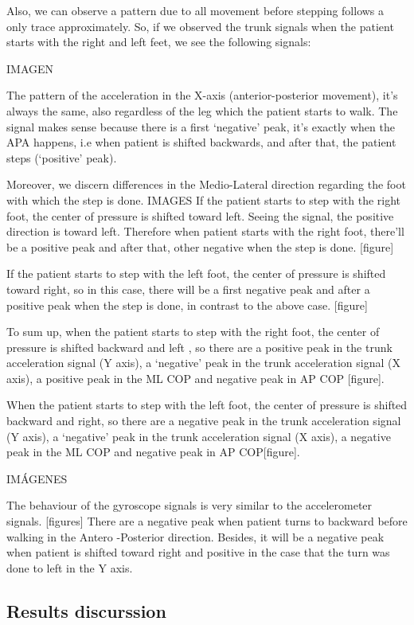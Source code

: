 Also, we can observe a pattern due to all movement before stepping follows a only trace approximately. So, if we observed the trunk signals when the patient starts with the right and left feet, we see the following signals:

IMAGEN

The pattern of the acceleration in the X-axis (anterior-posterior movement), it’s always the same, also regardless of the leg which the patient starts to walk. The signal makes sense because there is a first ‘negative’ peak, it’s exactly when the APA happens, i.e when patient is shifted backwards, and after that, the patient steps (‘positive’ peak).

Moreover, we discern differences in the Medio-Lateral direction regarding the foot with which the step is done. 
IMAGES
If the patient starts to step with the right foot, the center of pressure is shifted toward left. Seeing the signal, the positive direction is toward left. Therefore when patient starts with the right foot, there’ll be a positive peak and after that, other negative when the step is done. [figure]

If the patient starts to step with the left foot, the center of pressure is shifted toward right, so in this case, there will be a first negative peak and after a positive peak when the step is done, in contrast to the above case. [figure]

To sum up, when the patient starts to step with the right foot, the center of pressure  is shifted backward and left ,  so there are a positive peak in the trunk acceleration signal (Y axis), a ‘negative’ peak in the trunk acceleration signal (X axis), a positive peak in the ML COP and negative peak in AP COP [figure]. 

When the patient starts to step with the left foot, the center of pressure is shifted backward and right, so there are a negative peak in the trunk acceleration signal (Y axis), a ‘negative’ peak in the trunk acceleration signal (X axis), a negative peak in the ML COP and negative peak in AP COP[figure].   
                 
IMÁGENES

The behaviour of the gyroscope signals is very similar to the accelerometer signals. [figures]
There are a negative peak when patient turns to backward before walking in the Antero -Posterior direction. Besides, it will be a negative peak when patient is shifted toward right and positive in the case that the turn was done to left in the Y axis.



\subsection{Results discurssion}
